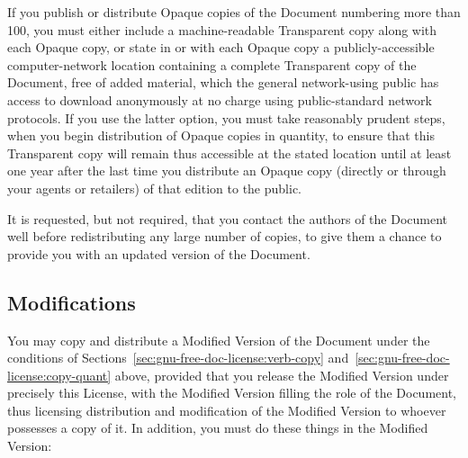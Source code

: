 \documentclass[11pt,a4paper,oneside]{alb-corp}
\begin{document}
If you publish or distribute Opaque copies of the Document numbering
more than 100, you must either include a machine-readable Transparent
copy along with each Opaque copy, or state in or with each Opaque copy a
publicly-accessible computer-network location containing a complete
Transparent copy of the Document, free of added material, which the
general network-using public has access to download anonymously at no
charge using public-standard network protocols.  If you use the latter
option, you must take reasonably prudent steps, when you begin
distribution of Opaque copies in quantity, to ensure that this
Transparent copy will remain thus accessible at the stated location
until at least one year after the last time you distribute an Opaque
copy (directly or through your agents or retailers) of that edition to
the public.

It is requested, but not required, that you contact the authors of the
Document well before redistributing any large number of copies, to give
them a chance to provide you with an updated version of the Document.


\subsection{Modifications}
\label{sec:gnu-free-doc-license:modif}

You may copy and distribute a Modified Version of the Document under the
conditions of Sections~\ref{sec:gnu-free-doc-license:verb-copy}
and~\ref{sec:gnu-free-doc-license:copy-quant} above, provided that you
release the Modified Version under precisely this License, with the
Modified Version filling the role of the Document, thus licensing
distribution and modification of the Modified Version to whoever
possesses a copy of it.  In addition, you must do these things in the
Modified Version:
\end{document}
